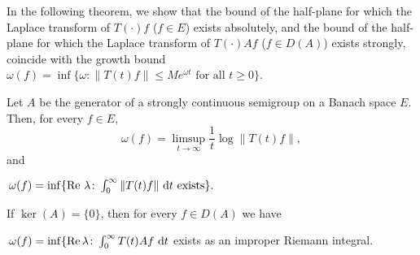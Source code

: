 In the following theorem, we show that the bound of the half-plane for which the Laplace transform of $T(\cdot)f$ ($f \in E$) exists absolutely, and the bound of the half-plane for which the Laplace transform of $T(\cdot)Af$ ($f \in D(A)$) exists strongly, coincide with the growth bound $\omega(f) = \inf\{\omega\colon\|T(t)f\| \leq Me^{\omega t} \text{ for all } t \geq 0\}$.
\begin{theorem}\label{thm:a4-1.3}
Let $A$ be the generator of a strongly continuous semigroup on a Banach space $E$. 
Then, for every $f \in E$,
\begin{equation}\label{eq:a4-1.2}
\omega(f) = \limsup_{t \to \infty} \frac{1}{t}\log\|T(t)f\|,
\end{equation}
and
\begin{enumerate*}[(i)]
\item 
$\,\omega(f) = \inf\{\mathop{}\!\mathrm{Re}\,\,\lambda\colon\int_{0}^{\infty} \|T(t)f\| \,\mathop{}\!\mathrm{d}{t} \text{ exists}\}.$
\end{enumerate*}
If\/ $\ker(A) = \{0\}$, then for every $f \in D(A)$ we have
\begin{enumerate*}[(i), resume]
\item 
$\,\omega(f) = \inf\{\mathop{}\!\mathrm{Re}\,\lambda\colon\int_{0}^{\infty} T(t)Af \,\mathop{}\!\mathrm{d}{t}$
exists as an improper Riemann integral.
\end{enumerate*}
\end{theorem}
